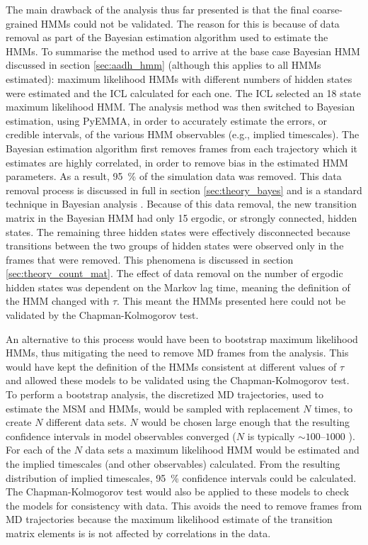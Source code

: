 The main drawback of the analysis thus far presented is that the final coarse-grained HMMs could not be validated. The reason for this is because of data removal as part of the Bayesian estimation algorithm used to estimate the HMMs.  To summarise the method used to arrive at the base case Bayesian HMM discussed in section \ref{sec:aadh_hmm} (although this applies to all HMMs estimated): maximum likelihood HMMs with different numbers of hidden states were estimated and the ICL calculated for each one.  The ICL selected an \num{18} state maximum likelihood HMM. The analysis method was then switched to Bayesian estimation, using PyEMMA, in order to accurately estimate the errors, or credible intervals, of the various HMM observables (e.g., implied timescales). The Bayesian estimation algorithm first removes frames from each trajectory which it estimates are highly correlated, in order to remove bias in the estimated HMM parameters. As a result, \SI{95}{\percent} of the simulation data was removed. This data removal process is discussed in full in section \ref{sec:theory_bayes} and is a standard technique in Bayesian analysis \cite{gelmanBayesianDataAnalysis2014}. Because of this data removal, the new transition matrix in the Bayesian HMM had only \num{15} ergodic, or strongly connected, hidden states.  The remaining three hidden states were effectively disconnected because transitions between the two groups of hidden states were observed only in the frames that were removed. This phenomena is discussed in section \ref{sec:theory_count_mat}.  The effect of data removal on the number of ergodic hidden states was dependent on the Markov lag time, meaning the definition of the HMM changed with $\tau$. This meant the HMMs presented here could not be validated by the Chapman-Kolmogorov test. 

An alternative to this process would have been to bootstrap maximum likelihood HMMs, thus mitigating the need to remove MD frames from the analysis. This would have kept the definition of the HMMs consistent at different values of $\tau$ and allowed these models to be validated using the Chapman-Kolmogorov test. To perform a bootstrap analysis, the discretized MD trajectories, used to estimate the MSM and HMMs, would be sampled with replacement $N$ times, to create $N$ different data sets.  $N$ would be chosen large enough that the resulting confidence intervals in model observables converged ($N$ is typically $\sim\numrange[range-phrase=\text{--}]{100}{1000}$ \cite{efronIntroductionBootstrap1993}). For each of the $N$ data sets a maximum likelihood HMM would be estimated and the implied timescales (and other observables) calculated. From the resulting distribution of implied timescales, \SI{95}{\percent} confidence intervals could be calculated. The Chapman-Kolmogorov test would also be applied to these models to check the models for consistency with data. This avoids the need to remove frames from MD trajectories because the maximum  likelihood estimate of the transition matrix elements is is not affected by correlations in the data. 

